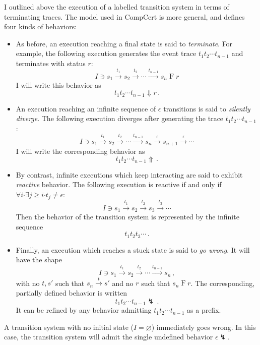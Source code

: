 \documentclass[11pt,oneside]{book}
\theoremstyle{definition}
\newcommand{\bdot}{\boldsymbol{\cdot}}
\begin{document}
I outlined above the execution of a labelled transition system
in terms of terminating traces.
The model used in CompCert is more general,
and defines four kinds of behaviors:
\begin{itemize}
\item As before, an execution reaching a final state is said to
    \emph{terminate}.
    For example,
    the following execution generates
    the event trace $t_1 t_2 \cdots t_{n-1}$
    and terminates with status $r$:
    \[
        I \ni s_1 \stackrel{t_1}{\rightarrow}
          s_2 \stackrel{t_2}{\rightarrow}
          \cdots \stackrel{t_{n-1}}{\rightarrow}
          s_n \mathrel{F} r
    \]
    I will write this behavior as
    \[
      t_1 t_2 \cdots t_{n-1} \Downarrow r
      \,.
    \]
\item An execution reaching
    an infinite sequence of $\epsilon$ transitions
    is said to \emph{silently diverge}.
    The following execution diverges after
    generating the trace $t_1 t_2 \cdots t_{n-1}$:
    \[
        I \ni s_1 \stackrel{t_1}{\rightarrow}
          s_2 \stackrel{t_2}{\rightarrow}
          \cdots \stackrel{t_{n-1}}{\rightarrow}
          s_n \stackrel{\epsilon}{\rightarrow}
          s_{n+1} \stackrel{\epsilon}{\rightarrow}
          \cdots
    \]
    I will write the corresponding behavior as
    \[
      t_1 t_2 \cdots t_{n-1} \Uparrow
      \,.
    \]
\item By contrast,
    infinite executions which keep interacting
    are said to exhibit \emph{reactive} behavior.
    The following execution
    is reactive if and only if
    $\forall i \bdot \exists j \ge i \bdot t_j \ne \epsilon$:
    \[
        I \ni s_1 \stackrel{t_1}{\rightarrow}
          s_2 \stackrel{t_2}{\rightarrow}
          s_3 \stackrel{t_3}{\rightarrow}
          \cdots
    \]
    Then the behavior of the transition system
    is represented by the infinite sequence
    \[
      t_1 t_2 t_3 \cdots
      \,.
    \]
\item Finally, an execution which reaches a stuck state
    is said to \emph{go wrong}. It will have the shape
    \[
        I \ni s_1 \stackrel{t_1}{\rightarrow}
          s_2 \stackrel{t_2}{\rightarrow}
          \cdots \stackrel{t_{n-1}}{\rightarrow}
          s_n \,,
    \]
    with no $t, s'$ such that
    $s_n \stackrel{t}{\rightarrow} s'$
    and no $r$ such that $s_n \mathrel{F} r$.
    The corresponding, partially defined behavior is written
    \[
      t_1 t_2 \cdots t_{n-1} \lightning
      \,.
    \]
    It can be refined by any behavior
    admitting $t_1 t_2 \cdots t_{n-1}$ as a prefix.
\end{itemize}
A transition system with no initial state ($I = \varnothing$)
immediately goes wrong.
In this case,
the transition system will admit the single undefined behavior
$\epsilon \lightning$.
\end{document}
